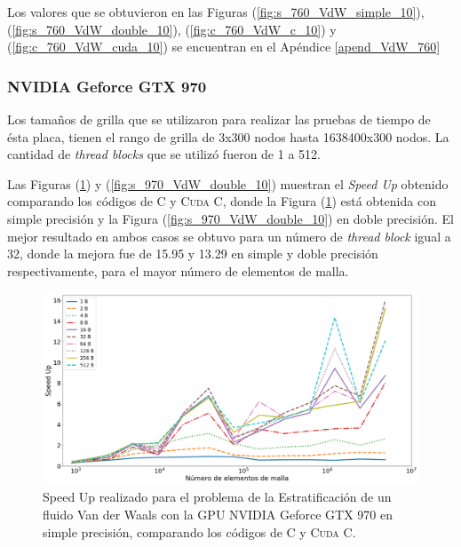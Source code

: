 Los valores que se obtuvieron en las Figuras (\ref{fig:s_760_VdW_simple_10}), (\ref{fig:s_760_VdW_double_10}), (\ref{fig:c_760_VdW_c_10}) y (\ref{fig:c_760_VdW_cuda_10}) se encuentran en el Apéndice \ref{apend_VdW_760}

\newpage

\subsubsection{NVIDIA Geforce GTX 970}

Los tamaños de grilla que se utilizaron para realizar las pruebas de tiempo de ésta placa, tienen el rango de grilla de 3x300 nodos hasta 1638400x300 nodos. La cantidad de \textit{thread blocks} que se utilizó fueron de 1 a 512.

Las Figuras (\ref{fig:s_970_VdW_simple_10}) y (\ref{fig:s_970_VdW_double_10}) muestran el \textit{Speed Up} obtenido comparando los códigos de \textsc{C} y \textsc{Cuda C}, donde la Figura (\ref{fig:s_970_VdW_simple_10}) está obtenida con simple precisión y la Figura (\ref{fig:s_970_VdW_double_10}) en doble precisión. El mejor resultado en ambos casos se obtuvo para un número de \textit{thread block} igual a 32, donde la mejora fue de 15.95 y 13.29 en simple y doble precisión respectivamente, para el mayor número de elementos de malla.


\begin{figure}[htbp]
	\centering
	\includegraphics[width=\textwidth]{figs/cap4/s_970_VdW_simple_10}
	\caption{Speed Up realizado para el problema de la Estratificación de un fluido Van der Waals con la GPU NVIDIA Geforce GTX 970 en simple precisión, comparando los códigos de \textsc{C} y \textsc{Cuda C}.} 
	\label{fig:s_970_VdW_simple_10}	
\end{figure}

